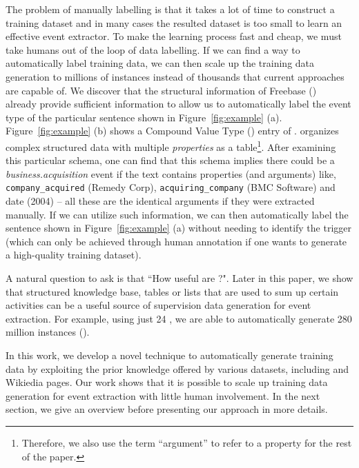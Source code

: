 
The problem of manually labelling is that it takes a lot of time to construct a training dataset and in many cases the resulted dataset is
too small to learn an effective event extractor. To make the learning process fast and cheap, we must take humans out of the loop of data
labelling. If we can find a way to automatically label training data, we can then scale up the training data generation to millions of
instances instead of thousands that current approaches are capable of. We discover that the structural information of Freebase
(\FB)~\cite{bollacker2008freebase} already provide sufficient information to allow us to automatically label the event type of the
particular sentence shown in Figure~\ref{fig:example} (a). Figure~\ref{fig:example} (b) shows a Compound Value Type (\CVT) entry of \FB.
\CVT organizes complex structured data with multiple \emph{properties} as a table\footnote{Therefore, we also use the term ``argument” to
refer to a \CVT property for the rest of the paper.}. After examining this particular \CVT schema, one can find that this schema implies
there could be a \emph{business.acquisition} event if the text contains properties (and arguments) like, \texttt{company\_acquired} (Remedy
Corp), \texttt{acquiring\_company} (BMC Software) and date (2004) -- all these are the identical arguments if they were extracted manually.
If we can utilize such \CVT information, we can then automatically label the sentence shown in Figure~\ref{fig:example} (a) without needing
to identify the trigger (which can only be achieved through human annotation if one wants to generate a high-quality training dataset).


A natural question to ask is that ``How useful are \CVTs?". Later in this paper, we show that structured knowledge base, tables or lists
that are used to sum up certain activities can be a useful source of supervision data generation for event extraction. For example, using
just 24 \CVTs, we are able to automatically generate 280 million instances ().


In this work, we develop a novel technique to automatically generate training data by exploiting the prior \CVT knowledge offered by
various datasets, including \FB and Wikiedia pages. Our work shows that it is possible to scale up training data generation for event
extraction with little human involvement. In the next section, we give an overview before presenting our approach in more details.


